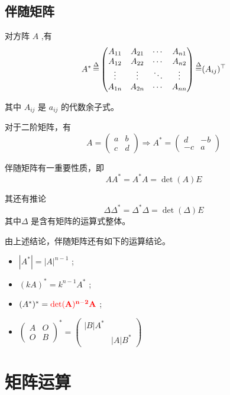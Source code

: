 \subsection{伴随矩阵}

对方阵 $ A $ ,有
$$
    A^* \mathop=\limits^\Delta \begin{pmatrix}
        A_{11} & A_{21} & \cdots & A_{n1}\\
        A_{12} & A_{22} & \cdots & A_{n2}\\
        \vdots & \vdots & \ddots & \vdots\\
        A_{1n} & A_{2n} & \cdots & A_{nn}\\
    \end{pmatrix} \mathop=\limits^\Delta (A_{ij})^\top
$$ 

其中 $ A_{ij} $ 是 $ a_{ij} $ 的代数余子式。

对于二阶矩阵，有$$
    A = \begin{pmatrix}
        a&b\\c&d
    \end{pmatrix}
    \Rightarrow
    A^* = \begin{pmatrix}
        d & -b \\ -c & a
    \end{pmatrix}
$$ 

伴随矩阵有一重要性质，即
$$
    AA^* = A^*A = \det(A)E 
$$ 

其还有推论$$
    \Delta\Delta^* = \Delta^*\Delta = \det(\Delta)E 
$$ 
其中$ \Delta $ 是含有矩阵的运算式整体。

由上述结论，伴随矩阵还有如下的运算结论。
\begin{itemize}
    \item $ |A^*| = |A|^{n-1} $ ;
    \item $ (kA)^* = k^{n-1}A^*$ ;
    \item $ (A^*)^* = \textcolor{red}{\bf{\det(A)^{n-2}A}} $ ;
    \item $ \begin{pmatrix}
        A&O\\O&B
    \end{pmatrix}^* = \begin{pmatrix}
        |B|A^*&\\&|A|B^*
    \end{pmatrix} $ 
\end{itemize}

\section{矩阵运算}

